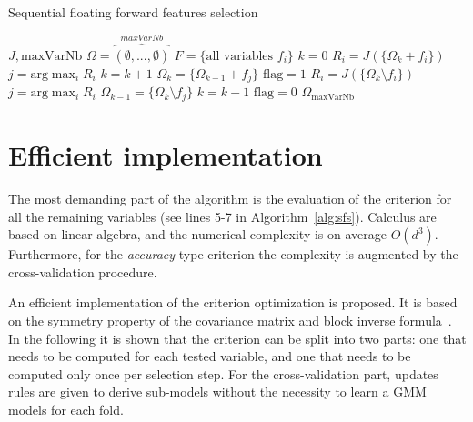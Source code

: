 \documentclass[journal]{IEEEtran}
\begin{document}
        \begin{algorithm}
        \caption{Sequential floating forward features selection\label{alg:sffs}}
        {\footnotesize
        \begin{algorithmic}[1]
        \REQUIRE $J,\text{maxVarNb}$
        \STATE $\Omega=\overbrace{(\emptyset,...,\emptyset)}^{maxVarNb}$
        \STATE $F=\text{\{all variables $f_i$\}}$
        \STATE $k=0$
        \STATE $R_i = J(\{\Omega_k + f_i\})$
        \ENDFOR
        \STATE $j=\text{arg} \max_{i} R_i$
        \STATE $k=k+1$
        \STATE $\Omega_k = \{\Omega_{k-1} + f_j\}$
        \STATE $\text{flag}=1$
        \STATE $R_i = J(\{\Omega_k \setminus f_i\})$
        \ENDFOR
        \STATE $j=\text{arg} \max_{i} R_i$
        \STATE $\Omega_{k-1} = \{\Omega_k \setminus f_j\}$
        \STATE $k=k-1$
        \ELSE
        \STATE $\text{flag}=0$
        \ENDIF
        \ENDWHILE
        \ENDIF
        \ENDWHILE
        \RETURN $\Omega_{\text{maxVarNb}}$
        \end{algorithmic}
        }
        \end{algorithm}


\section{Efficient implementation}
\label{sec:implementation}
The most  demanding part  of the  algorithm is  the evaluation  of the
criterion  for  all   the  remaining  variables  (see   lines  5-7  in
Algorithm~\ref{alg:sfs}). Calculus are based on linear algebra, and the
numerical  complexity is  on average  $O(d^3)$.  Furthermore,  for the
\emph{accuracy}-type  criterion the  complexity  is  augmented by  the
cross-validation procedure.

An efficient implementation of the criterion optimization is proposed.
It is based on  the symmetry property of the covariance  matrix and block
inverse  formula~\cite{IMM2012-03274}. In  the following  it is  shown
that the criterion  can be split into  two parts: one that  needs to be
computed for each  tested variable, and one that needs  to be computed
only once per  selection step. For the  cross-validation part, updates
rules are given to derive sub-models  without the necessity to learn a
GMM models for each fold.
\end{document}
